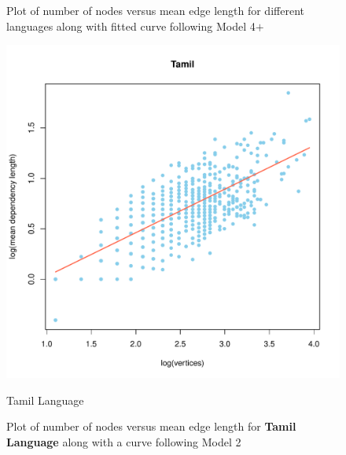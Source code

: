 \documentclass[a4paper]{article}
\begin{document}
\begin{figure}[hbtp]
	\caption{Plot of number of nodes versus mean edge length for different languages along with fitted curve following Model 4$+$}
\end{figure}


\begin{figure}[hbtp]
	\centering
	\includegraphics[scale=0.38]{Tamil}
	\label{Tamil Language}
	\caption{Tamil Language}
	\caption{Plot of number of nodes versus mean edge length for \textbf{Tamil Language} along with a curve following Model 2}
\end{figure}
\end{document}
